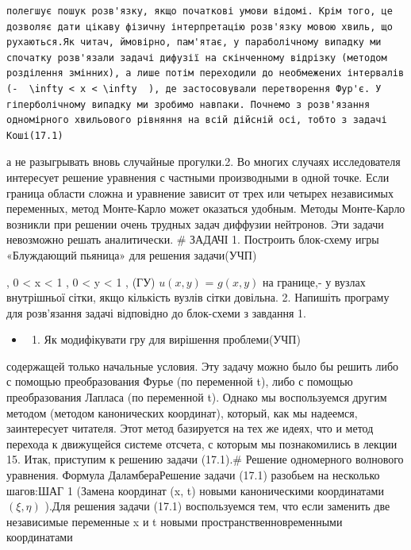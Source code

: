 \documentclass[
  ukrainian,
]{article}
\providecommand{\tightlist}{%
  \setlength{\itemsep}{0pt}\setlength{\parskip}{0pt}}
\begin{document}
\begin{verbatim}
полегшує пошук розв'язку, якщо початкові умови відомі. Крім того, це дозволяє дати цікаву фізичну інтерпретацію розв'язку мовою хвиль, що рухаються.Як читач, ймовірно, пам'ятає, у параболічному випадку ми спочатку розв'язали задачі дифузії на скінченному відрізку (методом розділення змінних), а лише потім переходили до необмежених інтервалів (-  \infty < x < \infty  ), де застосовували перетворення Фур'є. У гіперболічному випадку ми зробимо навпаки. Почнемо з розв'язання одномірного хвильового рівняння на всій дійсній осі, тобто з задачі Коші(17.1)
\end{verbatim}

а не разыгрывать вновь случайные прогулки.2. Во многих случаях
исследователя интересует решение уравнения с частными производными в
одной точке. Если граница области сложна и уравнение зависит от трех или
четырех независимых переменных, метод Монте-Карло может оказаться
удобным. Методы Монте-Карло возникли при решении очень трудных задач
диффузии нейтронов. Эти задачи невозможно решать аналитически. \# ЗАДАЧІ
1. Построить блок-схему игры «Блуждающий пьяница» для решения
задачи(УЧП)

, 0 \textless{} x \textless{} 1 , 0 \textless{} y \textless{} 1 , (ГУ)
\(u(x, y)\) = \(g(x, y)\) на границе,- у вузлах внутрішньої сітки, якщо
кількість вузлів сітки довільна. 2. Напишіть програму для розв'язання
задачі відповідно до блок-схеми з завдання 1.

\begin{itemize}
\tightlist
\item
  \begin{enumerate}
  \def\labelenumi{\arabic{enumi}.}
  \setcounter{enumi}{2}
  \tightlist
  \item
    Як модифікувати гру для вирішення проблеми(УЧП)
  \end{enumerate}
\end{itemize}

содержащей только начальные условия. Эту задачу можно было бы решить
либо с помощью преобразования Фурье (по переменной t), либо с помощью
преобразования Лапласа (по переменной t). Однако мы воспользуемся другим
методом (методом канонических координат), который, как мы надеемся,
заинтересует читателя. Этот метод базируется на тех же идеях, что и
метод перехода к движущейся системе отсчета, с которым мы познакомились
в лекции 15. Итак, приступим к решению задачи (17.1).\# Решение
одномерного волнового уравнения. Формула ДаламбераРешение задачи (17.1)
разобьем на несколько шагов:ШАГ 1 (Замена координат (x, t) новыми
каноническими координатами \((\xi, \eta)\) ).Для решения задачи (17.1)
воспользуемся тем, что если заменить две независимые переменные x и t
новыми пространственновременными координатами
\end{document}
